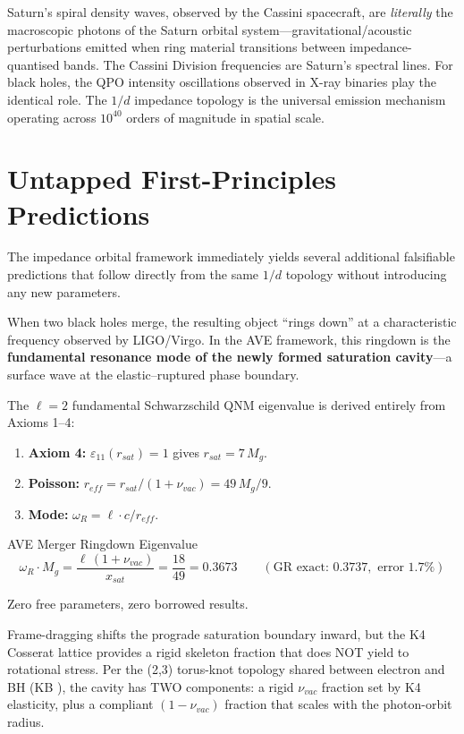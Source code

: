 Saturn's spiral density waves, observed by the Cassini spacecraft, are \textit{literally} the macroscopic photons of the Saturn orbital system---gravitational/acoustic perturbations emitted when ring material transitions between impedance-quantised bands. The Cassini Division frequencies are Saturn's spectral lines. For black holes, the QPO intensity oscillations observed in X-ray binaries play the identical role. The $1/d$ impedance topology is the universal emission mechanism operating across $10^{40}$ orders of magnitude in spatial scale.

\section{Untapped First-Principles Predictions}

The impedance orbital framework immediately yields several additional falsifiable predictions that follow directly from the same $1/d$ topology without introducing any new parameters.

When two black holes merge, the resulting object ``rings down'' at a characteristic frequency observed by LIGO/Virgo. In the AVE framework, this ringdown is the \textbf{fundamental resonance mode of the newly formed saturation cavity}---a surface wave at the elastic--ruptured phase boundary.

The $\ell = 2$ fundamental Schwarzschild QNM eigenvalue is derived entirely from Axioms 1--4:
\begin{enumerate}
    \item \textbf{Axiom 4:} $\varepsilon_{11}(r_{sat}) = 1$ gives $r_{sat} = 7\,M_g$.
    \item \textbf{Poisson:} $r_{eff} = r_{sat}/(1 + \nu_{vac}) = 49\,M_g/9$.
    \item \textbf{Mode:} $\omega_R = \ell \cdot c / r_{eff}$.
\end{enumerate}
\begin{resultbox}{AVE Merger Ringdown Eigenvalue}
\begin{equation}
    \omega_R \cdot M_g = \frac{\ell\,(1 + \nu_{vac})}{x_{sat}} = \frac{18}{49} = 0.3673
    \qquad (\text{GR exact: } 0.3737, \text{ error } 1.7\%)
\end{equation}
\end{resultbox}
\noindent Zero free parameters, zero borrowed results.

Frame-dragging shifts the prograde saturation boundary inward, but the K4 Cosserat lattice provides a rigid skeleton fraction that does NOT yield to rotational stress. Per the (2,3) torus-knot topology shared between electron and BH (KB ), the cavity has TWO components: a rigid $\nu_{vac}$ fraction set by K4 elasticity, plus a compliant $(1 - \nu_{vac})$ fraction that scales with the photon-orbit radius.

